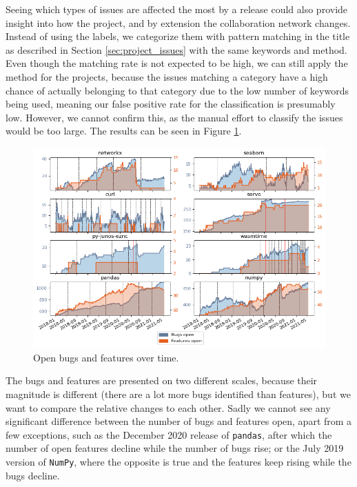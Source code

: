 Seeing which types of issues are affected the most by a release could also provide insight into how the project, and by extension the collaboration network changes. Instead of using the labels, we categorize them with pattern matching in the title as described in Section \ref{sec:project_issues} with the same keywords and method. Even though the matching rate is not expected to be high, we can still apply the method for the projects, because the issues matching a category have a high chance of actually belonging to that category due to the low number of keywords being used, meaning our false positive rate for the classification is presumably low. However, we cannot confirm this, as the manual effort to classify the issues would be too large. The results can be seen in Figure \ref{fig:open_bugs_features}.

\begin{figure}
    \centering
    \includegraphics[width=\textwidth]{figures/qualitative/issues_closed_created/features_and_bugs.png}
    \caption{Open bugs and features over time.}
    \label{fig:open_bugs_features}
\end{figure}

The bugs and features are presented on two different scales, because their magnitude is different (there are a lot more bugs identified than features), but we want to compare the relative changes to each other. Sadly we cannot see any significant difference between the number of bugs and features open, apart from a few exceptions, such as the December 2020 release of \texttt{pandas}, after which the number of open features decline while the number of bugs rise; or the July 2019 version of \texttt{NumPy}, where the opposite is true and the features keep rising while the bugs decline.

